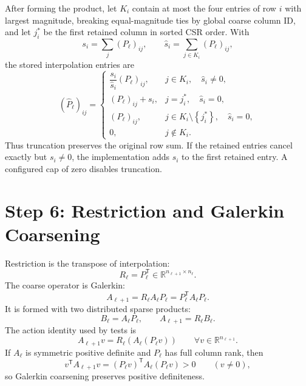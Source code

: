 \documentclass[11pt]{article}
\newcommand{\R}{\mathbb{R}}
\newcommand{\set}[1]{\left\{ #1 \right\}}
\newcommand{\trans}{^{\mathsf T}}
\newcommand{\level}{\ell}
\begin{document}
After forming the product, let $K_i$ contain at most the four entries of row
$i$ with largest magnitude, breaking equal-magnitude ties by global coarse
column ID, and let $j_i^*$ be the first retained column in sorted CSR order.
With
\begin{equation}
  s_i=\sum_j(P_\level)_{ij},
  \qquad
  \widehat s_i=\sum_{j\in K_i}(P_\level)_{ij},
  \label{eq:truncation-row-sums}
\end{equation}
the stored interpolation entries are
\begin{equation}
  (\widehat P_\level)_{ij}
  =
  \begin{cases}
    \dfrac{s_i}{\widehat s_i}(P_\level)_{ij},
      & j\in K_i,\quad \widehat s_i\neq0,\\[2mm]
    (P_\level)_{ij}+s_i,
      & j=j_i^*,\quad \widehat s_i=0,\\
    (P_\level)_{ij},
      & j\in K_i\setminus\set{j_i^*},\quad \widehat s_i=0,\\
    0, & j\notin K_i.
  \end{cases}
  \label{eq:interpolation-truncation}
\end{equation}
Thus truncation preserves the original row sum.  If the retained entries
cancel exactly but $s_i\neq0$, the implementation adds $s_i$ to the first
retained entry.  A configured cap of zero disables truncation.

\section{Step 6: Restriction and Galerkin Coarsening}

Restriction is the transpose of interpolation:
\begin{equation}
  R_\level=P_\level\trans
  \in\R^{n_{\level+1}\times n_\level}.
  \label{eq:transpose-restriction}
\end{equation}
The coarse operator is Galerkin:
\begin{equation}
  A_{\level+1}
  =
  R_\level A_\level P_\level
  =
  P_\level\trans A_\level P_\level.
  \label{eq:galerkin-operator}
\end{equation}
It is formed with two distributed sparse products:
\begin{equation}
  B_\level=A_\level P_\level,
  \qquad
  A_{\level+1}=R_\level B_\level.
  \label{eq:two-stage-rap}
\end{equation}
The action identity used by tests is
\begin{equation}
  A_{\level+1}v
  =
  R_\level\left(A_\level(P_\level v)\right)
  \qquad
  \forall v\in\R^{n_{\level+1}}.
  \label{eq:galerkin-action-test}
\end{equation}
If $A_\level$ is symmetric positive definite and $P_\level$ has full column
rank, then
\begin{equation}
  v\trans A_{\level+1}v
  =
  (P_\level v)\trans A_\level(P_\level v)>0
  \qquad(v\neq0),
  \label{eq:spd-preservation}
\end{equation}
so Galerkin coarsening preserves positive definiteness.
\end{document}
